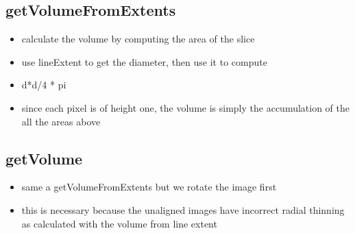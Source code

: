\documentclass[11pt]{article}
\begin{document}
\subsection{getVolumeFromExtents}
\label{sec:org7734fd9}
\begin{itemize}
\item calculate the volume by computing the area of the slice
\item use lineExtent to get the diameter, then use it to compute
\item d*d/4 * pi
\item since each pixel is of height one, the volume is simply
the accumulation of the all the areas above
\end{itemize}
\subsection{getVolume}
\label{sec:org2850c2b}
\begin{itemize}
\item same a getVolumeFromExtents but we rotate the image first
\item this is necessary because the unaligned images have incorrect
radial thinning as calculated with the volume from line extent
\end{itemize}
\end{document}
